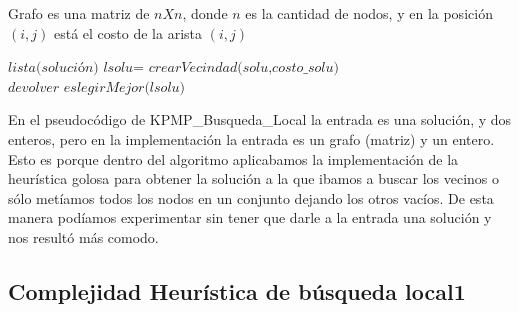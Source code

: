 \documentclass[a4paper]{article}
\begin{document}
Grafo es una matriz de $nXn$, donde $n$ es la cantidad de nodos, y en la posición $(i,j)$ está el costo de la arista $(i,j)$
\vspace{0.4cm}
\begin{algorithmic}[1]
	\State $\textit{lista(solución) lsolu= crearVecindad(solu,costo\_solu)} $
	\State $\textit{devolver eslegirMejor(lsolu)} $
	
\EndProcedure
\end{algorithmic}
\vspace{0.4cm}
En el pseudocódigo de K\-PMP\_Busqueda\_Local la entrada es una solución, y dos enteros, pero en la implementación la entrada es un grafo (matriz) y un entero. Esto es porque dentro del algoritmo aplicabamos la implementación de la heurística golosa para obtener la solución a la que ibamos a buscar los vecinos o sólo metíamos todos los nodos en un conjunto dejando los otros vacíos. De esta manera podíamos experimentar sin tener que darle a la entrada una solución y nos resultó más comodo. 



\subsection{Complejidad Heurística de búsqueda local1}
\end{document}
